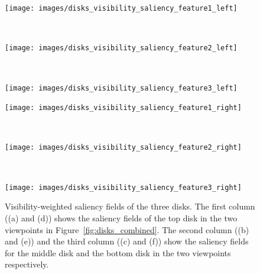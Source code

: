 \begin{figure}
	\centering
	\begin{minipage}{.3\textwidth}
		\texttt{[image: images/disks\_visibility\_saliency\_feature1\_left]}
		\subcaption{}
	\end{minipage}~
	\begin{minipage}{.3\textwidth}
		\texttt{[image: images/disks\_visibility\_saliency\_feature2\_left]}
		\subcaption{}
	\end{minipage}~
	\begin{minipage}{.3\textwidth}
		\texttt{[image: images/disks\_visibility\_saliency\_feature3\_left]}
		\subcaption{}
	\end{minipage}
	\begin{minipage}{.3\textwidth}
		\texttt{[image: images/disks\_visibility\_saliency\_feature1\_right]}
		\subcaption{}
	\end{minipage}~
	\begin{minipage}{.3\textwidth}
		\texttt{[image: images/disks\_visibility\_saliency\_feature2\_right]}
		\subcaption{}
	\end{minipage}~
	\begin{minipage}{.3\textwidth}
		\texttt{[image: images/disks\_visibility\_saliency\_feature3\_right]}
		\subcaption{}
	\end{minipage}
	\caption[Visibility-weighted saliency fields of the three disks]{Visibility-weighted saliency fields of the three disks. The first column ((a) and (d)) shows the saliency fields of the top disk in the two viewpoints in Figure~\ref{fig:disks_combined}. The second column ((b) and (e)) and the third column ((c) and (f)) show the saliency fields for the middle disk and the bottom disk in the two viewpoints respectively.}
	\label{fig:disks_visibility_saliency_fields}
\end{figure}

